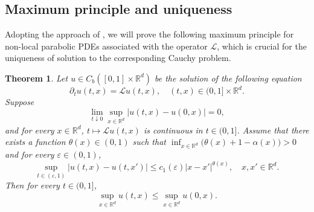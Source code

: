 \documentclass[a4paper,11pt]{amsart}
\renewcommand{\le}{\leqslant}
\newcommand{\R}{\mathds R}
\newcommand{\T}{\theta}
\newcommand{\A}{\alpha}
\newcommand{\e}{ \varepsilon}
\def\LL{{\mathcal L}}
\newtheorem{theorem}{Theorem}[section]
\theoremstyle{definition}
\begin{document}
\subsection{Maximum principle and uniqueness}

Adopting the approach of \cite[Theorem 4.1]{CZ}, we will prove the following maximum principle for non-local parabolic PDEs associated with the operator $\LL$, which is crucial for the uniqueness of solution to the
corresponding Cauchy problem.

\begin{theorem}\label{t4-3}
Let $u \in C_b([0,1]\times \R^d)$ be the solution of the following equation
\begin{equation}\label{t4-3-2a}
{\partial_t u(t,x)}= \LL u(t,x),\quad (t,x)\in (0,1]\times \R^d.
\end{equation}
Suppose \begin{equation}\label{t4-3-1}
\lim_{t \downarrow 0}\sup_{x \in \R^d}\big|u(t,x)-u(0,x)\big|=0,
\end{equation}
and for every $x \in \R^d$, $t \mapsto  \LL u(t,x)$ is continuous in $t \in (0,1]$.
Assume that there exists a function $\T(x)\in (0,1)$ such that
$\inf_{x \in \R^d}\big(\T(x)+1-\A(x)\big)>0$ and for every $\e \in (0,1)$,
\begin{equation}\label{t4-3-2}
\sup_{t \in (\e,1)}\big|u(t,x)-u(t,x')\big|\le c_1(\e)|x-x'|^{\T(x)},\quad x,x'\in \R^d.
\end{equation}
Then for every $t \in (0,1]$,
\begin{equation*}
\sup_{x \in \R^d}u(t,x)\le \sup_{x \in \R^d}u(0,x).
\end{equation*}
\end{theorem}
\end{document}
